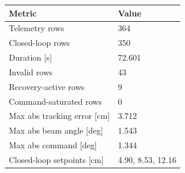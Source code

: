 \small
\begin{tabularx}{0.78\linewidth}{@{}l X@{}}
\toprule
Metric & Value \\
\midrule
Telemetry rows & 364 \\
Closed-loop rows & 350 \\
Duration [s] & 72.601 \\
Invalid rows & 43 \\
Recovery-active rows & 9 \\
Command-saturated rows & 0 \\
Max abs tracking error [cm] & 3.712 \\
Max abs beam angle [deg] & 1.543 \\
Max abs command [deg] & 1.344 \\
Closed-loop setpoints [cm] & 4.90, 8.53, 12.16 \\
\bottomrule
\end{tabularx}
